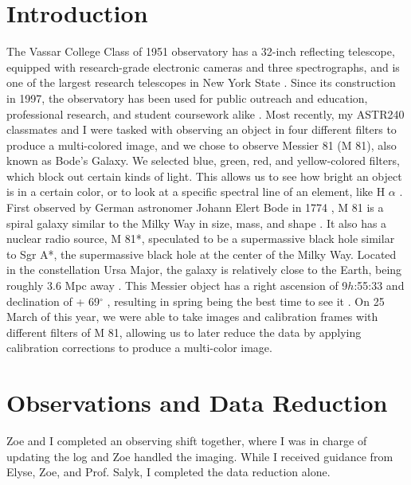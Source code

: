 \documentclass[]{aastex63}
\begin{document}
\section{Introduction}
The Vassar College Class of 1951 observatory has a 32-inch reflecting telescope, equipped with research-grade electronic cameras and three spectrographs, and is one of the largest research telescopes in New York State \citep{vassar}. Since its construction in 1997, the observatory has been used for public outreach and education, professional research, and student coursework alike \citep{vassar}. Most recently, my ASTR240 classmates and I were tasked with observing an object in four different filters to produce a multi-colored image, and we chose to observe Messier 81 (M 81), also known as Bode's Galaxy. We selected blue, green, red, and yellow-colored filters, which block out certain kinds of light. This allows us to see how bright an object is in a certain color, or to look at a specific spectral line of an element, like H $\alpha$ \citep{iowa}. First observed by German astronomer Johann Elert Bode in 1774 \citep{nasa}, M 81 is a spiral galaxy similar to the Milky Way \citep{brandt} in size, mass, and shape \citep{Brunthaler}. It also has a nuclear radio source, M 81*, speculated to be a supermassive black hole similar to Sgr A*, the supermassive black hole at the center of the Milky Way. Located in the constellation Ursa Major, the galaxy is relatively close to the Earth, being roughly 3.6 Mpc away \citep{Gurzadyan}. This Messier object has a right ascension of 9$h$:55:33 and declination of + 69$^{\circ}$ \citep{simbad}, resulting in spring being the best time to see it \citep{nasa}. On 25 March of this year, we were able to take images and calibration frames with different filters of M 81, allowing us to later reduce the data by applying calibration corrections to produce a multi-color image.

\section{Observations and Data Reduction}
Zoe and I completed an observing shift together, where I was in charge of updating the log and Zoe handled the imaging. While I received guidance from Elyse, Zoe, and Prof. Salyk, I completed the data reduction alone. 
\end{document}
